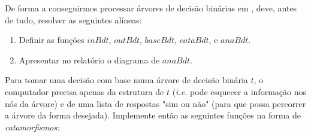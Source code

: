 \documentclass[a4paper]{article}
\newcommand{\Varid}[1]{\mathit{#1}}
\begin{document}
De forma a conseguirmos processar árvores de decisão binárias em \Haskell,
deve, antes de tudo, resolver as seguintes alíneas:
\begin{enumerate}
  \item Definir as funções \ensuremath{\Varid{inBdt}}, \ensuremath{\Varid{outBdt}}, \ensuremath{\Varid{baseBdt}}, \ensuremath{\Varid{cataBdt}}, e \ensuremath{\Varid{anaBdt}}.
  \item Apresentar no relatório o diagrama de \ensuremath{\Varid{anaBdt}}.
\end{enumerate}
Para tomar uma decisão com base numa árvore de decisão binária \ensuremath{\Varid{t}}, o
computador precisa apenas da estrutura de \ensuremath{\Varid{t}} (\emph{i.e.} pode esquecer
a informação nos nós da árvore) e de uma lista de respostas "sim ou não" (para
que possa percorrer a árvore da forma desejada). Implemente então as seguintes
funções na forma de \emph{catamorfismos}:
\end{document}
